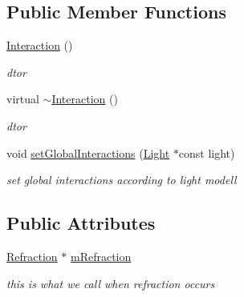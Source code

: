 \subsection*{Public Member Functions}
\begin{DoxyCompactItemize}
\item 
\hyperlink{classInteraction_aadfd0e254296043c26508d47090ace76}{Interaction} ()\hypertarget{classInteraction_aadfd0e254296043c26508d47090ace76}{}\label{classInteraction_aadfd0e254296043c26508d47090ace76}

\begin{DoxyCompactList}\small\item\em dtor \end{DoxyCompactList}\item 
virtual \hyperlink{classInteraction_a6610199fedc7fae617003cb2f397c825}{$\sim$\+Interaction} ()\hypertarget{classInteraction_a6610199fedc7fae617003cb2f397c825}{}\label{classInteraction_a6610199fedc7fae617003cb2f397c825}

\begin{DoxyCompactList}\small\item\em dtor \end{DoxyCompactList}\item 
void \hyperlink{classInteraction_a97cbbf080cda868a35f80cfbe7e673f5}{set\+Global\+Interactions} (\hyperlink{classLight}{Light} $\ast$const light)
\begin{DoxyCompactList}\small\item\em set global interactions according to light modell \end{DoxyCompactList}\end{DoxyCompactItemize}
\subsection*{Public Attributes}
\begin{DoxyCompactItemize}
\item 
\hyperlink{classRefraction}{Refraction} $\ast$ \hyperlink{classInteraction_a80f9aba433c1c701b1e1545372c25c20}{m\+Refraction}\hypertarget{classInteraction_a80f9aba433c1c701b1e1545372c25c20}{}\label{classInteraction_a80f9aba433c1c701b1e1545372c25c20}

\begin{DoxyCompactList}\small\item\em this is what we call when refraction occurs \end{DoxyCompactList}\end{DoxyCompactItemize}


